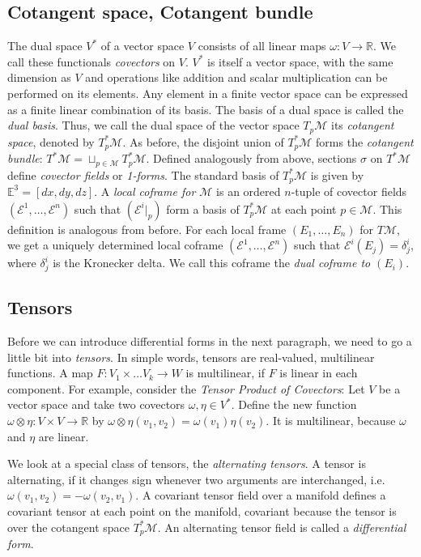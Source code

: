 \documentclass[../thesis.tex]{subfiles}
\begin{document}
\subsection{Cotangent space, Cotangent bundle} The dual space $V^*$ of a vector space $V$
consists of all linear maps $\omega: V \to \mathbb{R}$. We call these functionals \emph{covectors} on $V$.
$V^*$ is itself a vector space, with the same dimension as $V$ and operations like addition and scalar multiplication
can be performed on its elements. Any element in a finite vector space can be expressed as 
a finite linear combination of its basis. The basis of a dual space is called the \emph{dual basis}.
Thus, we call the dual space of the vector space $T_p\mathcal{M}$ its \emph{cotangent space},
denoted by $T^*_p\mathcal{M}$. As before, the disjoint union of $T^*_p\mathcal{M}$ forms the \emph{cotangent bundle}:
$T^*\mathcal{M}=\sqcup _{p\in \mathcal{M}}T^*_p\mathcal{M}$. Defined analogously from above,
sections $\sigma$ on $T^*\mathcal{M}$ define \emph{covector fields} or \emph{1-forms}. The standard basis of $T_p^*\mathcal{M}$
is given by $\mathbb{E}^3=[dx,dy,dz]$.
A \emph{local coframe for $\mathcal{M}$} is an ordered $n$-tuple of covector fields
$(\mathcal{E}^1,\dots, \mathcal{E}^n)$ such that $(\mathcal{E}^i|_p)$ form a basis
of $T^*_p\mathcal{M}$ at each point $p \in \mathcal{M}$. This definition is analogous from
before.
For each local frame $(E_1, \dots, E_n)$ for $T\mathcal{M}$, we get a uniquely
determined local coframe $(\mathcal{E}^1, \dots, \mathcal{E}^n)$ such that
$\mathcal{E}^i(E_j)=\delta^i_j$, where $\delta^i_j$ is the Kronecker delta.
We call this coframe the \emph{dual coframe to $(E_i)$}.



\subsection{Tensors}
Before we can introduce differential forms in the next paragraph, we need to go a little bit into \emph{tensors}.
In simple words, tensors are real-valued, multilinear functions.
A map $F: V_1 \times \dots V_k \to W$ is multilinear, if $F$ is linear in each component.
For example, consider the \emph{Tensor Product of Covectors}:
Let $V$ be a vector space and take two covectors $\omega, \eta \in V^*$.
Define the new function $\omega \otimes \eta: V\times V \to \mathbb{R}$ by
$\omega \otimes \eta (v_1,v_2) = \omega(v_1)\eta(v_2)$. It is multilinear, because $\omega$ and $\eta$ are linear.

We look at a special class of tensors, the \emph{alternating tensors}.
A tensor is alternating, if it changes sign whenever two arguments are interchanged,
i.e. $\omega(v_1, v_2) = -\omega(v_2, v_1)$.
A covariant tensor field over a manifold defines a covariant tensor at each point on the manifold,
covariant because the tensor is over the cotangent space $T^*_p\mathcal{M}$.
An alternating tensor field is called a \emph{differential form}.
\end{document}
